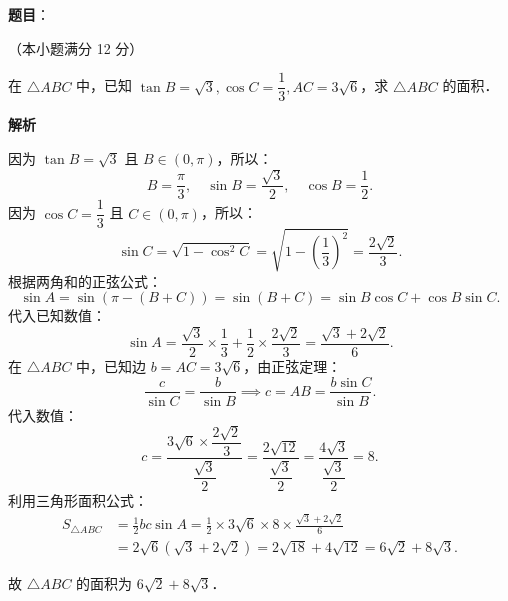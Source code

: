 \begin{answer}

\textbf{题目}：

（本小题满分 12 分）

在 $\triangle ABC$ 中，已知 $\tan B = \sqrt{3}, \cos C = \dfrac{1}{3}, AC = 3\sqrt{6}$，求 $\triangle ABC$ 的面积．

\textbf{解析}

因为 $\tan B = \sqrt{3}$ 且 $B \in (0, \pi)$，所以：
\nopagebreak[4]
\[
B = \frac{\pi}{3}, \quad \sin B = \frac{\sqrt{3}}{2}, \quad \cos B = \frac{1}{2}.
\]
因为 $\cos C = \dfrac{1}{3}$ 且 $C \in (0, \pi)$，所以：
\nopagebreak[4]
\[
\sin C = \sqrt{1 - \cos^2 C} = \sqrt{1 - \left(\frac{1}{3}\right)^2} = \frac{2\sqrt{2}}{3}.
\]
根据两角和的正弦公式：
\nopagebreak[4]
\[
\sin A = \sin(\pi - (B + C)) = \sin(B + C) = \sin B \cos C + \cos B \sin C.
\]
代入已知数值：
\nopagebreak[4]
\[
\sin A = \frac{\sqrt{3}}{2} \times \frac{1}{3} + \frac{1}{2} \times \frac{2\sqrt{2}}{3} = \frac{\sqrt{3} + 2\sqrt{2}}{6}.
\]
在 $\triangle ABC$ 中，已知边 $b = AC = 3\sqrt{6}$，由正弦定理：
\nopagebreak[4]
\[
\frac{c}{\sin C} = \frac{b}{\sin B} \implies c = AB = \frac{b \sin C}{\sin B}.
\]
代入数值：
\nopagebreak[4]
\[
c = \frac{3\sqrt{6} \times \dfrac{2\sqrt{2}}{3}}{\dfrac{\sqrt{3}}{2}} = \frac{2\sqrt{12}}{\dfrac{\sqrt{3}}{2}} = \frac{4\sqrt{3}}{\dfrac{\sqrt{3}}{2}} = 8.
\]
利用三角形面积公式：
\nopagebreak[4]
\[
\begin{aligned}
S_{\triangle ABC} &= \frac{1}{2} b c \sin A = \frac{1}{2} \times 3\sqrt{6} \times 8 \times \frac{\sqrt{3} + 2\sqrt{2}}{6} \\
&= 2\sqrt{6} (\sqrt{3} + 2\sqrt{2}) = 2\sqrt{18} + 4\sqrt{12} = 6\sqrt{2} + 8\sqrt{3}.
\end{aligned}
\]

故 $\triangle ABC$ 的面积为 $6\sqrt{2} + 8\sqrt{3}$．


\end{answer}
